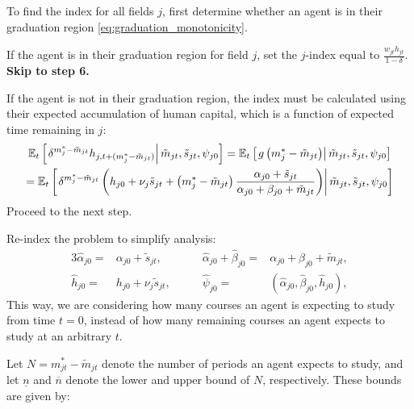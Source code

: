 \documentclass[11 pt]{article}
\newcommand{\pr}[1]{\left( #1 \right)}
\newcommand{\ce}[2]{\left[\left. #1 \right\vert #2 \right]}
\newcommand{\study}{m} %
\newcommand{\pass}{s}
\newcommand{\pstates}{\tilde{\study}_{jt}, \tilde{\pass}_{jt}, \psi_{j0}}
\newcommand*{\ks}[1][t]{\tilde{\pass}_{j #1}}
\begin{document}
\begin{outline}

\item To find the index for all fields $j$, first determine whether an agent is in their graduation region \eqref{eq:graduation_monotonicity}. 

\begin{outline}
    \item If the agent is in their graduation region for field $j$, set the $j$-index equal to $\frac{w_{jt} h_{jt}}{1 - \delta}$. \textbf{Skip to step 6.}

    \item If the agent is not in their graduation region, the index must be calculated using their expected accumulation of human capital, which is a function of expected time remaining in $j$:
\begin{multline*}
    \EE_t \ce{
        \delta^{\study_j^* - \tilde{\study}_{jt}}
        h_{j,t + (\study_j^* - \tilde{\study}_{jt})}
    }{\pstates}
    = 
    \EE_t 
    \ce{
        g\pr{\study_j^* - \tilde{\study}_{jt}}
    }{\pstates}
    \\
    =
    \EE_t 
    \ce{
        \delta^{\study_j^* - \tilde{\study}_{jt}}
        \pr{
            h_{j0} + \nu_j \ks
            + \pr{\study_j^* - \tilde{\study}_{jt}}
            \frac{\alpha_{j0} + \tilde{\pass}_{jt}}{\alpha_{j0} + \beta_{j0} + \tilde{\study}_{jt}}
        }
    }{\pstates}
\end{multline*}
    Proceed to the next step.
\end{outline}

\item Re-index the problem to simplify analysis:
\begin{alignat*}{3}
    \hat{\alpha}_{j0} =& \alpha_{j0} + \tilde{\pass}_{jt},
    \quad \quad
    &\hat{\alpha}_{j0} + \hat{\beta}_{j0} 
    =& \alpha_{j0} + \beta_{j0} + \tilde{\study}_{jt},
    \\
    \hat{h}_{j0} 
    =& h_{j0} + \nu_j \tilde{\pass}_{jt}, 
    \quad \quad
    &\hat{\psi}_{j0} 
    =& 
    \pr{\hat{\alpha}_{j0}, \hat{\beta}_{j0}, \hat{h}_{j0}},
\end{alignat*}
This way, we are considering how many courses an agent is expecting to study from time $t=0$, instead of how many remaining courses an agent expects to study at an arbitrary $t$.

\item Let $N = \study_{jt}^* - \tilde{\study}_{jt}$ denote the number of periods an agent expects to study, and let $\underline{n}$ and $\overline{n}$ denote the lower and upper bound of $N$, respectively. These bounds are given by:


\end{outline}
\end{document}

